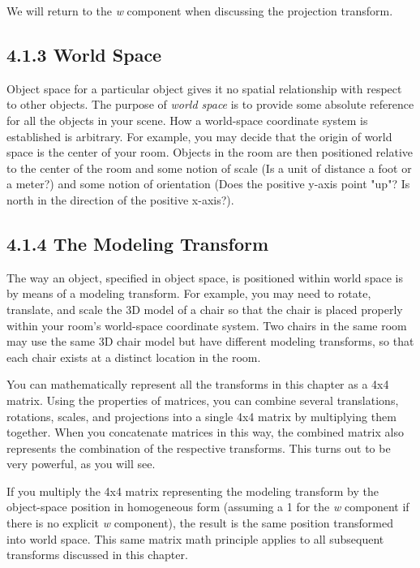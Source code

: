 \documentclass{book}
\begin{document}
We will return to the \textit{w} component when discussing the projection transform.

\subsection{4.1.3 World Space}

Object space for a particular object gives it no spatial relationship with respect to other objects. The purpose of \textit{world space} is to provide some absolute reference for all the objects in your scene. How a world-space coordinate system is established is arbitrary. For example, you may decide that the origin of world space is the center of your room. Objects in the room are then positioned relative to the center of the room and some notion of scale (Is a unit of distance a foot or a meter?) and some notion of orientation (Does the positive y-axis point "up"? Is north in the direction of the positive x-axis?).

\subsection{4.1.4 The Modeling Transform}

The way an object, specified in object space, is positioned within world space is by means of a modeling transform. For example, you may need to rotate, translate, and scale the 3D model of a chair so that the chair is placed properly within your room's world-space coordinate system. Two chairs in the same room may use the same 3D chair model but have different modeling transforms, so that each chair exists at a distinct location in the room.

You can mathematically represent all the transforms in this chapter as a 4x4 matrix. Using the properties of matrices, you can combine several translations, rotations, scales, and projections into a single 4x4 matrix by multiplying them together. When you concatenate matrices in this way, the combined matrix also represents the combination of the respective transforms. This turns out to be very powerful, as you will see.

If you multiply the 4x4 matrix representing the modeling transform by the object-space position in homogeneous form (assuming a 1 for the \textit{w} component if there is no explicit \textit{w} component), the result is the same position transformed into world space. This same matrix math principle applies to all subsequent transforms discussed in this chapter.
\end{document}
